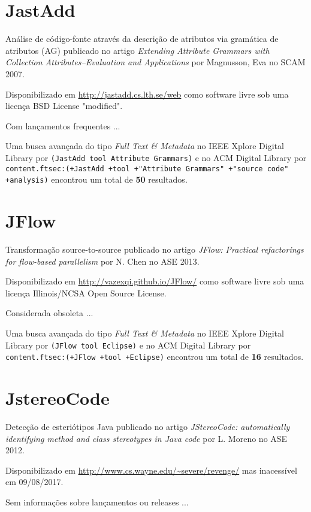 \section{JastAdd}

Análise de código-fonte através da descrição de atributos via gramática de atributos (AG)
publicado no artigo {\it Extending Attribute Grammars with Collection Attributes--Evaluation and Applications}
por Magnusson, Eva
no SCAM 2007.

Disponibilizado em \url{http://jastadd.cs.lth.se/web}
como software livre
sob uma licença BSD License "modified".

Com lançamentos frequentes ...


Uma busca avançada do tipo {\it Full Text \& Metadata} no IEEE Xplore Digital Library por
\texttt{(JastAdd tool Attribute Grammars)}
e no ACM Digital Library por
\texttt{content.ftsec:(+JastAdd +tool +"Attribute Grammars" +"source code" +analysis)}
encontrou um total de
{\bf 50}
resultados.

\section{JFlow}

Transformação source-to-source
publicado no artigo {\it JFlow: Practical refactorings for flow-based parallelism}
por N. Chen
no ASE 2013.

Disponibilizado em \url{http://vazexqi.github.io/JFlow/}
como software livre
sob uma licença Illinois/NCSA Open Source License.

Considerada obsoleta ...


Uma busca avançada do tipo {\it Full Text \& Metadata} no IEEE Xplore Digital Library por
\texttt{(JFlow tool Eclipse)}
e no ACM Digital Library por
\texttt{content.ftsec:(+JFlow +tool +Eclipse)}
encontrou um total de
{\bf 16}
resultados.

\section{JstereoCode}

Detecção de esteriótipos Java
publicado no artigo {\it JStereoCode: automatically identifying method and class stereotypes in Java code}
por L. Moreno
no ASE 2012.

Disponibilizado em \url{http://www.cs.wayne.edu/~severe/revenge/}
mas inacessível em 09/08/2017.

Sem informações sobre lançamentos ou releases ...


